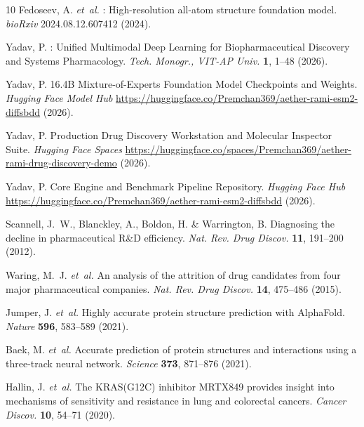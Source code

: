 \documentclass[11pt,a4paper]{article}
\begin{document}
\begin{thebibliography}{10}
Fedoseev, A. \emph{et~al.}
: High-resolution all-atom structure foundation model.
\newblock \emph{bioRxiv} 2024.08.12.607412 (2024).

Yadav, P.
: Unified Multimodal Deep Learning for Biopharmaceutical Discovery and Systems Pharmacology.
\newblock \emph{Tech. Monogr., VIT-AP Univ.} \textbf{1}, 1--48 (2026).

Yadav, P.
 16.4{B} Mixture-of-Experts Foundation Model Checkpoints and Weights.
\newblock \emph{Hugging Face Model Hub} \url{https://huggingface.co/Premchan369/aether-rami-esm2-diffsbdd} (2026).

Yadav, P.
 Production Drug Discovery Workstation and Molecular Inspector Suite.
\newblock \emph{Hugging Face Spaces} \url{https://huggingface.co/spaces/Premchan369/aether-rami-drug-discovery-demo} (2026).

Yadav, P.
 Core Engine and Benchmark Pipeline Repository.
\newblock \emph{Hugging Face Hub} \url{https://huggingface.co/Premchan369/aether-rami-esm2-diffsbdd} (2026).

Scannell, J.~W., Blanckley, A., Boldon, H. \& Warrington, B.
\newblock Diagnosing the decline in pharmaceutical {R\&D} efficiency.
\newblock \emph{Nat. Rev. Drug Discov.} \textbf{11}, 191--200 (2012).

Waring, M.~J. \emph{et~al.}
\newblock An analysis of the attrition of drug candidates from four major pharmaceutical companies.
\newblock \emph{Nat. Rev. Drug Discov.} \textbf{14}, 475--486 (2015).

Jumper, J. \emph{et~al.}
\newblock Highly accurate protein structure prediction with {AlphaFold}.
\newblock \emph{Nature} \textbf{596}, 583--589 (2021).

Baek, M. \emph{et~al.}
\newblock Accurate prediction of protein structures and interactions using a three-track neural network.
\newblock \emph{Science} \textbf{373}, 871--876 (2021).

Hallin, J. \emph{et~al.}
\newblock The {KRAS(G12C)} inhibitor {MRTX849} provides insight into mechanisms of sensitivity and resistance in lung and colorectal cancers.
\newblock \emph{Cancer Discov.} \textbf{10}, 54--71 (2020).


\end{thebibliography}
\end{document}
